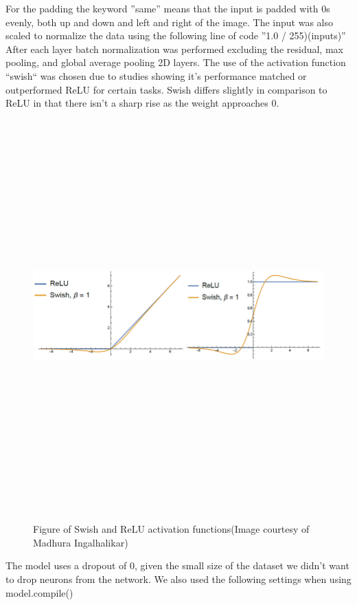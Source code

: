 For the padding the keyword ''same'' means that the input is padded with 0s evenly, both up and down and left and right of the image. The input was also scaled to normalize the data using the following line of code ''1.0 / 255)(inputs)''  After each layer batch normalization was performed excluding the residual, max pooling, and global average pooling 2D layers.  The use of the activation function ``swish`` was chosen due to studies showing it's performance matched or outperformed ReLU for certain tasks\cite{swishAndRelu}. Swish differs slightly in comparison to ReLU in that there isn't a sharp rise as the weight approaches 0. 
 \begin{figure}[H]
    \centering
    \includegraphics[width=1\textwidth,height=15cm,keepaspectratio]{Images/Swish ReLU activations.PNG}\\
    \caption{Figure of Swish and ReLU activation functions(Image courtesy of Madhura Ingalhalikar)\cite{swishReluDiagram}}
    \label{fig:Figure of Swish and ReLU activation functions}
\end{figure}
The model uses a dropout of 0, given the small size of the dataset we didn't want to drop neurons from the network. We also used the following settings when using model.compile() 
